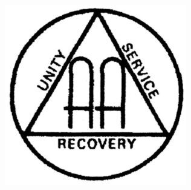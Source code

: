 \begin{titlingpage}
\begin{biblechapter}
\end{biblechapter}

\newpage
\begin{biblechapter}

    \centering
    \vspace*{\fill}
    \includegraphics[scale=0.9]{img/symbol2.png}
    \vspace*{\fill}

\end{biblechapter}

\end{titlingpage}

